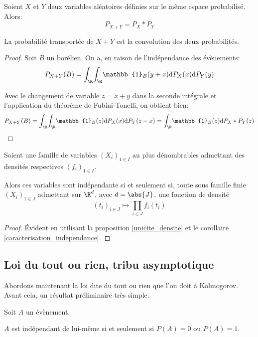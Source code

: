\begin{prop}
Soient $X$ et $Y$ deux variables aléatoires définies sur le même espace probabilisé. Alors:
\[
P_{X+Y} = P_X * P_Y
\]

La probabilité transportée de $X+Y$ est la convolution des deux probabilités.
\end{prop}

\begin{proof}
Soit $B$ un borélien. On a, en raison de l'indépendance des évènements:
\[
P_{X+Y}(B) = \displaystyle{\int_\R} \displaystyle{\int_\R}  \mathbb{1}_{B} (y+x) \mathrm d P_X(x)  \mathrm d P_Y(y)
\]


Avec le changement de variable $z = x+y$ dans la seconde intégrale et l'application du théorème de Fubini-Tonelli, on obtient bien:
\[
P_{X+Y}(B) = \displaystyle{\int_\R} \displaystyle{\int_\R}  \mathbb{1}_{B} (z) \mathrm d P_X(x) \mathrm d P_Y(z-x) = \displaystyle{\int_\R} \mathbb{1}_{B} (z) \mathrm d P_X * P_Y (z)
\]
\end{proof}

\begin{prop}
Soient une famille de variables $(X_i)_{1 \in I}$ au plus dénombrables admettant des densités respectives $(f_i)_{1 \in I}$.

Alors ces variables sont indépendante si et seulement si, toute sous famille finie $(X_i)_{1 \in J}$ admettant sur $\R^d$, avec $d = \abs{J}$, une fonction de densité 
\[
(t_i)_{i \in J}
\mapsto
\displaystyle{\prod \limits_{i \in J}} f_i(t_i)
\]
\end{prop}

\begin{proof}
Évident en utilisant la proposition \ref{unicite_densite} et le corollaire \ref{caracterisation_independance}.
\end{proof}

\subsection{Loi du tout ou rien, tribu asymptotique}

Abordons maintenant la loi dite du tout ou rien que l'on doit à Kolmogorov. Avant cela, un résultat préliminaire très simple.


\begin{lem}
Soit $A$ un évènement.

$A$ est indépendant de lui-même si et seulement si $P(A)=0$ ou $P(A)=1$.
\end{lem}


